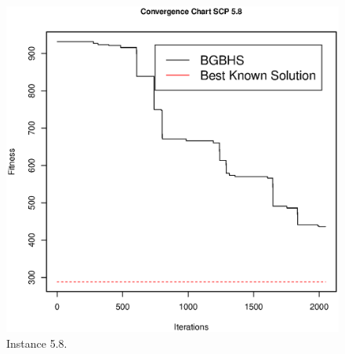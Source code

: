 \begin{figure}[]
\centering
\includegraphics[scale=.45]{Resultados/scp58.eps}
\caption{Instance 5.8.}
\label{fig:Instance.5.8}
\end{figure}

\clearpage


